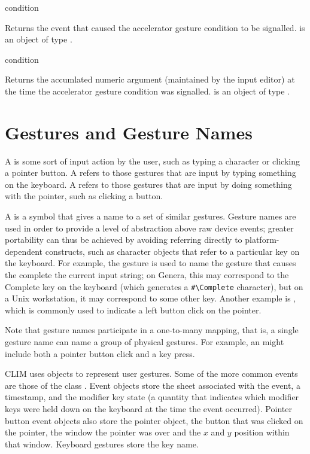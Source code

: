  {condition}

Returns the event that caused the accelerator gesture condition to be signalled.
 is an object of type .

 {condition}

Returns the accumlated numeric argument (maintained by the input editor) at the
time the accelerator gesture condition was signalled.   is an
object of type .


\section {Gestures and Gesture Names\label{gesture-names}}

A  is some sort of input action by the user, such as typing a
character or clicking a pointer button.  A  refers to
those gestures that are input by typing something on the keyboard.  A
 refers to those gestures that are input by doing
something with the pointer, such as clicking a button.

A  is a symbol that gives a name to a set of similar
gestures.  Gesture names are used in order to provide a level of abstraction
above raw device events; greater portability can thus be achieved by avoiding
referring directly to platform-dependent constructs, such as character objects
that refer to a particular key on the keyboard.  For example, the 
gesture is used to name the gesture that causes the  complete
the current input string; on Genera, this may correspond to the Complete key on
the keyboard (which generates a \verb+#\Complete+ character), but on a Unix
workstation, it may correspond to some other key.  Another example is
, which is commonly used to indicate a left button click on the
pointer.

Note that gesture names participate in a one-to-many mapping, that is, a single
gesture name can name a group of physical gestures.  For example, an 
might include both a pointer button click and a key press.

CLIM uses  objects to represent user gestures.  Some of the more
common events are those of the class .  Event objects
store the sheet associated with the event, a timestamp, and the modifier key
state (a quantity that indicates which modifier keys were held down on the
keyboard at the time the event occurred).  Pointer button event objects also
store the pointer object, the button that was clicked on the pointer, the window
the pointer was over and the $x$ and $y$ position within that window.  Keyboard
gestures store the key name.

